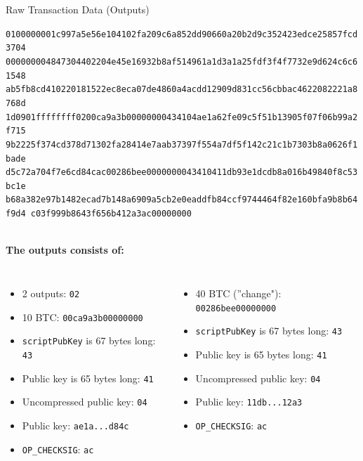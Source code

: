 \documentclass[]{beamer}
\begin{document}
\begin{frame}{Raw Transaction Data (Outputs)}
\begin{scriptsize}
\texttt{\textcolor{black!30}{0100000001c997a5e56e104102fa209c6a852dd90660a20b2d9c352423edce25857fcd3704
000000004847304402204e45e16932b8af514961a1d3a1a25fdf3f4f7732e9d624c6c61548
ab5fb8cd410220181522ec8eca07de4860a4acdd12909d831cc56cbbac4622082221a8768d
1d0901ffffffff}{\alert<2>{02}\alert<3>{00ca9a3b00000000}\alert<4>{43}\alert<5>{41}\alert<6>{04}\alert<7>{ae1a62fe09c5f51b13905f07f06b99a2f715
9b2225f374cd378d71302fa28414e7aab37397f554a7df5f142c21c1b7303b8a0626f1bade
d5c72a704f7e6cd84c}\alert<8>{ac}\alert<9>{00286bee00000000}\alert<10>{43}\alert<11>{41}\alert<12>{04}\alert<13>{11db93e1dcdb8a016b49840f8c53bc1e
b68a382e97b1482ecad7b148a6909a5cb2e0eaddfb84ccf9744464f82e160bfa9b8b64f9d4
c03f999b8643f656b412a3}\alert<14>{ac}}\textcolor{black!30}{00000000}}
\end{scriptsize}
\vspace{1em}
\scriptsize \\
\textbf{The outputs consists of:}\\
\begin{columns}[T]
\begin{itemize}
	\item \alert<2>{2 outputs: \texttt{02}}
	\item \alert<3>{10 BTC: \texttt{00ca9a3b00000000}}
	\item \alert<4>{\texttt{scriptPubKey} is 67 bytes long: \texttt{43}}
	\item \alert<5>{Public key is 65 bytes long: \texttt{41}}
	\item \alert<6>{Uncompressed public key: \texttt{04}}
	\item \alert<7>{Public key: \texttt{ae1a...d84c}}
	\item \textcolor{black!50}{\alert<8>{\texttt{OP\_CHECKSIG}: \texttt{ac}}}
\end{itemize}
\begin{itemize}
	\item \alert<9>{40 BTC (''change"): \texttt{00286bee00000000}}
	\item \alert<10>{\texttt{scriptPubKey} is 67 bytes long: \texttt{43}}
	\item \alert<11>{Public key is 65 bytes long: \texttt{41}}
	\item \alert<12>{Uncompressed public key: \texttt{04}}
	\item \alert<13>{Public key: \texttt{11db...12a3}}
	\item \textcolor{black!50}{\alert<14>{\texttt{OP\_CHECKSIG}: \texttt{ac}}}
\end{itemize}
\end{columns}

\end{frame}
\end{document}
